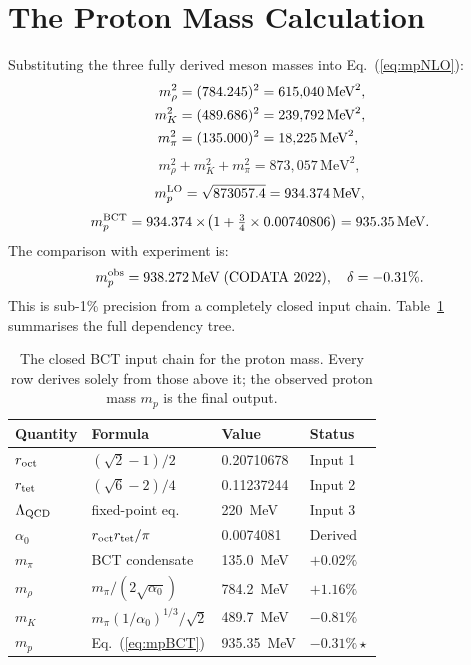 \documentclass[10pt,twocolumn]{article}
\begin{document}
\section{The Proton Mass Calculation}

Substituting the three fully derived meson masses into Eq.~(\ref{eq:mpNLO}):
\begin{align}
m_\rho^2 &= (784.245)^2 = 615{,}040\,\text{MeV}^2, \notag\\
m_K^2    &= (489.686)^2 = 239{,}792\,\text{MeV}^2, \label{eq:squares}\\
m_\pi^2  &= (135.000)^2 = 18{,}225\,\text{MeV}^2, \notag
\end{align}
\begin{equation}
m_\rho^2 + m_K^2 + m_\pi^2 = 873{,}057\,\text{MeV}^2,
\label{eq:sum}
\end{equation}
\begin{equation}
m_p^{\rm LO} = \sqrt{873057.4} = 934.374\,\text{MeV},
\label{eq:mpLO}
\end{equation}
\begin{equation}
m_p^{\rm BCT} = 934.374\times\!\left(1 + \tfrac{3}{4}\times 0.00740806\right)
              = 935.35\,\text{MeV}.
\label{eq:mpBCT}
\end{equation}
The comparison with experiment is:
\begin{equation}
m_p^{\rm obs} = 938.272\,\text{MeV}\;\text{(CODATA 2022)},\quad
\delta = -0.31\%.
\label{eq:mpobs}
\end{equation}
This is sub-1\% precision from a completely closed input chain. Table~\ref{tab:chain} summarises
the full dependency tree.

\begin{table}[h]
\centering\small
\caption{The closed BCT input chain for the proton mass. Every row derives solely from those
above it; the observed proton mass $m_p$ is the final output.}
\label{tab:chain}
\begin{tabular}{@{}llll@{}}
\toprule
Quantity & Formula & Value & Status \\
\midrule
$r_{\rm oct}$      & $(\sqrt{2}-1)/2$          & 0.20710678  & Input 1 \\
$r_{\rm tet}$      & $(\sqrt{6}-2)/4$          & 0.11237244  & Input 2 \\
$\Lambda_{\rm QCD}$& fixed-point eq.           & 220~MeV     & Input 3 \\
$\alpha_0$         & $r_{\rm oct}r_{\rm tet}/\pi$ & 0.0074081 & Derived \\
$m_\pi$            & BCT condensate            & 135.0~MeV   & $+0.02\%$ \\
$m_\rho$           & $m_\pi/(2\sqrt{\alpha_0})$& 784.2~MeV   & $+1.16\%$ \\
$m_K$              & $m_\pi(1/\alpha_0)^{1/3}/\sqrt{2}$ & 489.7~MeV & $-0.81\%$ \\
$m_p$              & Eq.~(\ref{eq:mpBCT})      & 935.35~MeV  & $\mathbf{-0.31\%\star}$ \\
\bottomrule
\end{tabular}
\end{table}
\end{document}

